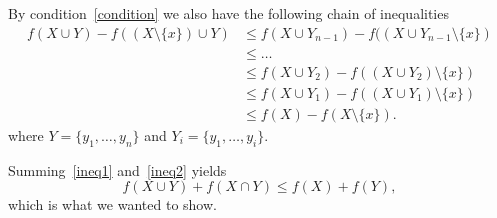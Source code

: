 \begin{exercise}{1}
    By condition~\ref{condition} we also have the following chain of
    inequalities
    \begin{equation}\label{ineq2}
    \begin{split}
        f(X \cup Y) - f((X \setminus \{x\}) \cup Y) &\leq f(X \cup Y_{n-1}) -
        f((X \cup Y_{n-1} \setminus \{x\}) \\
        &\leq \dots \\
        &\leq f(X \cup Y_2) - f((X \cup Y_2) \setminus \{x\}) \\
        &\leq f(X \cup Y_1) - f((X \cup Y_1) \setminus \{x\}) \\
        &\leq f(X) - f(X \setminus \{x\}).
    \end{split}
    \end{equation}
    where $Y = \{y_1, \dots, y_n\}$ and $Y_i = \{y_1, \dots, y_i\}$.

    Summing~\ref{ineq1} and~\ref{ineq2} yields
    \begin{equation*}
        f(X \cup Y) + f(X \cap Y) \leq f(X) + f(Y),
    \end{equation*}
    which is what we wanted to show.
\end{exercise}

